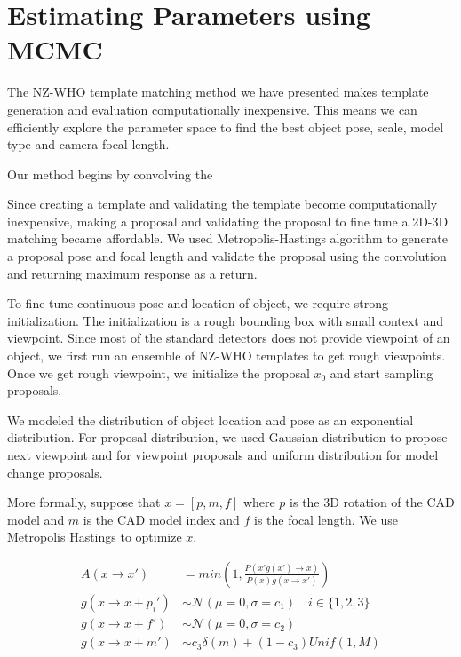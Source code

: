 \documentclass[10pt,twocolumn,letterpaper]{article}
\begin{document}
\section{Estimating Parameters using MCMC}
\label{sec:fine}
The NZ-WHO template matching method we have presented makes template generation
and evaluation computationally inexpensive. This means we can efficiently
explore the parameter space to find the best object pose, scale, model type and
camera focal length.

Our method begins by convolving the 

Since creating a template and validating the template become computationally
inexpensive, making a proposal and validating the proposal to fine tune a 2D-3D
matching became affordable. We used Metropolis-Hastings algorithm to generate a
proposal pose and focal length and validate the proposal using the convolution
and returning maximum response as a return.

To fine-tune continuous pose and location of object, we require strong
initialization. The initialization is a rough bounding box with small context
and viewpoint. Since most of the standard detectors does not provide viewpoint
of an object, we first run an ensemble of NZ-WHO templates to get rough
viewpoints. Once we get rough viewpoint, we initialize the proposal $x_0$ and
start sampling proposals.

We modeled the distribution of object location and pose as an exponential distribution. 
For proposal distribution, we used Gaussian distribution to propose next viewpoint and for viewpoint proposals
and uniform distribution for model change proposals.  

More formally, suppose that $x = [p, m, f]$ where $p$ is the 3D rotation of the CAD model and
$m$ is the CAD model index and $f$ is the focal length. We use Metropolis Hastings
to optimize $x$.

\begin{align}
    A(x \rightarrow x') & =  min\left( 1,  \frac{P(x' g(x') \rightarrow x)}{P(x) g(x \rightarrow x')}\right) \\
    g(x \rightarrow x + p_i') & \sim \mathcal{N}(\mu = 0,\sigma = c_1) \quad i \in \{1,2,3\}\\
    g(x \rightarrow x + f') & \sim \mathcal{N}(\mu = 0,\sigma = c_2)\\
    g(x \rightarrow x + m') & \sim c_3 \delta(m) + (1-c_3) Unif(1,M)
\end{align}
\end{document}
